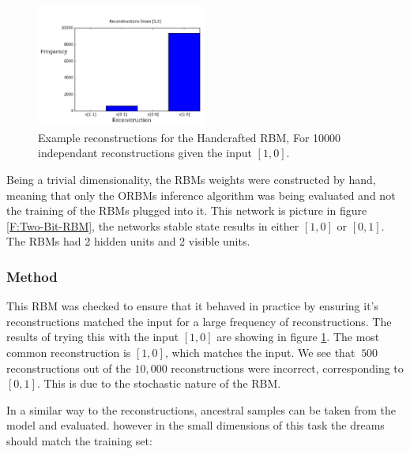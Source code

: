 \begin{figure}
  \begin{center}
    \includegraphics[width=0.5\textwidth]{Assets/Two-Bit-RBM-Recon.png}
  \end{center}
  \caption{Example reconstructions for the Handcrafted RBM, For 10000 independant reconstructions given the input $[1,0]$.}
  \label{F:Two-Bit-RBM-Recons}
\end{figure}

Being a trivial dimensionality, the RBMs weights were constructed by hand, meaning that only the ORBMs inference algorithm was being evaluated and not the training of the RBMs plugged into it. This network is picture in figure \ref{F:Two-Bit-RBM},  the networks stable state results in either $[1 , 0]$ or $[0 , 1]$. The RBMs had 2 hidden units and 2 visible units.

\subsubsection{Method}

This RBM was checked to ensure that it behaved in practice by ensuring it's reconstructions matched the input for a large frequency of reconstructions. The results of trying this with the input $[1,0]$ are showing in figure \ref{F:Two-Bit-RBM-Recons}. The most common reconstruction is  $[1,0]$, which matches the input. We see that $~500$ reconstructions out of the $10,000$ reconstructions were incorrect, corresponding to $[0,1]$. This is due to the stochastic nature of the RBM.



In a similar way to the reconstructions, ancestral samples can be taken from the model and evaluated.  however in the small dimensions of this task the dreams should match the training set:

